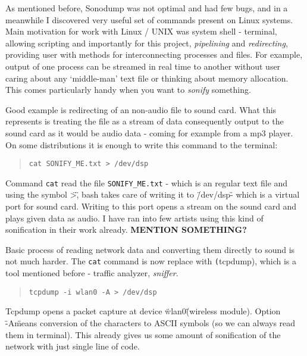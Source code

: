 \documentclass[11pt,a4paper,oneside]{report}
\begin{document}
As mentioned before, Sonodump was not optimal and had few bugs, and in a meanwhile I discovered very useful set of commands present on Linux systems. Main motivation for work with Linux / UNIX was system shell - terminal, allowing scripting and importantly for this project, \textit{pipelining} and \textit{redirecting}, providing user with methods for interconnecting processes and files. For example, output of one process can be streamed in real time to another without user caring about any `middle-man' text file or thinking about memory allocation. This comes particularly handy when you want to \textit{sonify} something. 

Good example is redirecting of an non-audio file to sound card. What this represents is treating the file as a stream of data consequently output to the sound card as it would be audio data - coming for example from a mp3 player. On some distributions it is enough to write this command to the terminal:

\begin{quotation}
	\texttt{cat SONIFY\_ME.txt > /dev/dsp}
\end{quotation}

Command \texttt{cat} read the file \texttt{SONIFY\_ME.txt} - which is an regular text file and using the symbol \">\", bash takes care of writing it to \"/dev/dsp\" - which is a virtual port for sound card. Writing to this port opens a stream on the sound card and plays given data as audio. I have ran into few artists using this kind of sonification in their work already. \textbf{MENTION SOMETHING?}

Basic process of reading network data and converting them directly to sound is not much harder. The \texttt{cat} command is now replace with \texttt(tcpdump), which is a tool mentioned before - traffic analyzer, \textit{sniffer}.

\begin{quotation}
	\texttt{tcpdump -i wlan0 -A > /dev/dsp}
\end{quotation}

Tcpdump opens a packet capture at device \"wlan0\" (wireless module). Option \"-A\" means conversion of the characters to ASCII symbols (so we can always read them in terminal).
This already gives us some amount of sonification of the network with just single line of code. 

\end{document}

